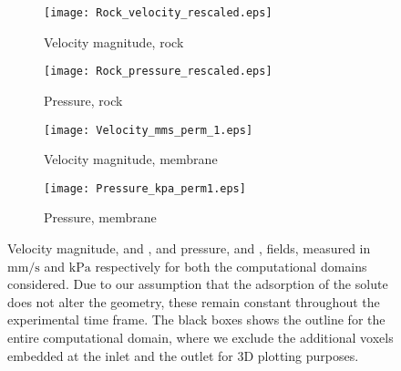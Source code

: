 \documentclass[preprint, 1p, authoryear]{elsarticle}
\begin{document}
\begin{figure}
\centering
\begin{subfigure}[c]{0.495\textwidth}
\texttt{[image: Rock\_velocity\_rescaled.eps]}
\caption{Velocity magnitude, rock}
\label{fig:Rock_velocity_rescaled}
\end{subfigure}
\begin{subfigure}[c]{0.495\textwidth}
\texttt{[image: Rock\_pressure\_rescaled.eps]}
\caption{Pressure, rock}
\label{fig:Rock_pressure_rescaled}
\end{subfigure}
\begin{subfigure}[c]{0.495\textwidth}
\texttt{[image: Velocity\_mms\_perm\_1.eps]}
\caption{Velocity magnitude, membrane}
\label{fig:Velocity_cut_perm_1_all}
\end{subfigure}
\begin{subfigure}[c]{0.495\textwidth}
\texttt{[image: Pressure\_kpa\_perm1.eps]}
\caption{Pressure, membrane}
\label{fig:Pressure_cut_perm_1_all}
\end{subfigure}
\caption{Velocity magnitude,  and ,  and pressure,  and ,  fields, measured in $\mathrm{mm}/\mathrm{s}$ and $\mathrm{kPa}$ respectively for both the computational domains considered.  Due to our assumption that the adsorption of the solute does not alter the geometry, these remain constant throughout the experimental time frame. The black boxes shows the outline for the entire computational domain, where we exclude the additional voxels embedded at the inlet and the outlet for 3D plotting purposes. }
\label{fig:Velocity_pressure}
\end{figure}
\end{document}
